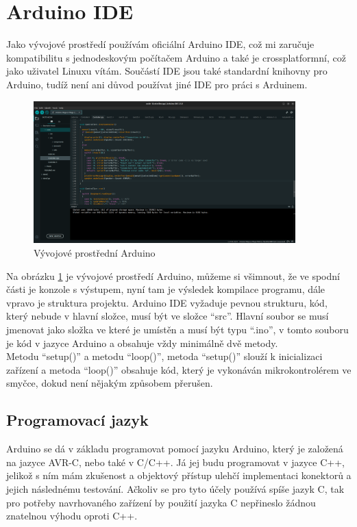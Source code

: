 
\section{Arduino IDE}
Jako vývojové prostředí používám oficiální Arduino IDE, což mi zaručuje kompatibilitu s jednodeskovým počítačem Arduino a také je crossplatformní, což jako uživatel Linuxu vítám. Součástí IDE jsou také standardní knihovny pro Arduino, tudíž není ani důvod používat jiné IDE pro práci s Arduinem.

\begin{figure}[H]
	\centering
	\includegraphics[width=0.9\textwidth]{pictures/arduinoIDE.png}
    	\caption{Vývojové prostřední Arduino}
   	\label{fig:arduinoIDE}
\end{figure}

Na obrázku \ref{fig:arduinoIDE} je vývojové prostředí Arduino, můžeme si všimnout, že ve spodní části je konzole s výstupem, nyní tam je výsledek kompilace programu, dále vpravo je struktura projektu. Arduino IDE vyžaduje pevnou strukturu, kód, který nebude v hlavní složce, musí být ve složce “src”. Hlavní soubor se musí jmenovat jako složka ve které je umístěn a musí být typu “.ino”, v tomto souboru je kód v jazyce Arduino a obsahuje vždy minimálně dvě metody.\\
Metodu “setup()” a metodu “loop()”, metoda “setup()” slouží k inicializaci zařízení a metoda “loop()” obsahuje kód, který je vykonáván mikrokontrolérem ve smyčce, dokud není nějakým způsobem přerušen.

\subsection{Programovací jazyk}
Arduino se dá v základu programovat pomocí jazyku Arduino, který je založená na jazyce AVR-C, nebo také v C/C++. Já jej budu programovat v jazyce C++, jelikož s ním mám zkušenost a objektový přístup ulehčí implementaci konektorů a jejich následnému testování. Ačkoliv se pro tyto účely používá spíše jazyk C, tak pro potřeby navrhovaného zařízení by použití jazyka C nepřineslo žádnou znatelnou výhodu oproti C++.